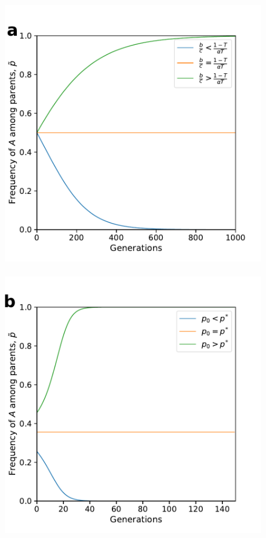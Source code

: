 \documentclass[12pt]{extarticle}
\begin{document}
{%
\begin{figure}[h]
  \centering
    \includegraphics[scale=0.45]{Time_Figure_Equal_Horizontal.pdf}
    ~\\
    \includegraphics[scale=0.45]{Time_Figure_Only_Vertical_No_Alpha.pdf}

\end{figure}}
\end{document}
